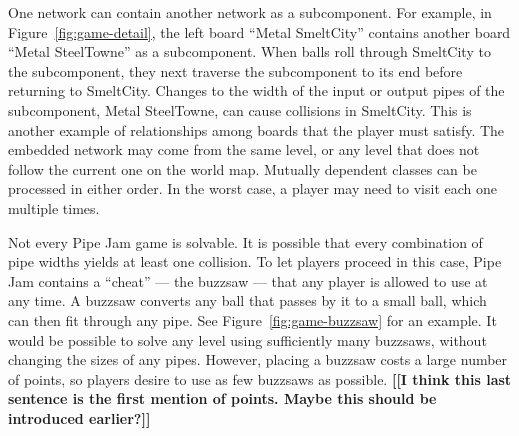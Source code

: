 \documentclass{sig-alternate}
\newcommand{\todo}[1]{{\color{red}\bfseries [[#1]]}}
\let\Description =\description
\def\Nospacing{\itemsep=0pt\topsep=0pt\partopsep=0pt\parskip=0pt\parsep=0pt}
\renewenvironment{description}{\Description\Nospacing}{\endlist}
\begin{document}
\begin{description}
\item[Embedded networks]
  One network can contain another network as a subcomponent.  For example,
  in Figure~\ref{fig:game-detail}, the left board ``Metal SmeltCity''
  contains another board ``Metal SteelTowne'' as a subcomponent.  When
  balls roll through SmeltCity to the subcomponent, they next traverse the
  subcomponent to its end before returning to SmeltCity.  Changes to the
  width of the input or output pipes of the subcomponent, Metal SteelTowne,
  can cause collisions in SmeltCity.  This is another example of
  relationships among boards that the player must satisfy.
  The embedded network may come from the same level, or any level that
  does not follow the current one on the world map.  Mutually dependent
  classes can be processed in either order.  In the worst case, a player
  may need to visit each one multiple times.

\item[Buzzsaws:  Exceptions to the laws of physics]
  Not every Pipe Jam game is solvable.  It is possible that every
  combination of pipe widths yields at least one collision.  To let players
  proceed in this case, Pipe Jam contains a ``cheat'' --- the buzzsaw ---
  that any player is allowed to use at any time.  A buzzsaw converts any
  ball that passes by it to a small ball, which can then fit through any
  pipe.  See Figure~\ref{fig:game-buzzsaw} for an example.
  It would be possible to solve any level using sufficiently many buzzsaws,
  without changing the sizes of any pipes.  However, placing a buzzsaw
  costs a large number of points, so players desire to use as few buzzsaws
  as possible.
  \todo{I think this last sentence is the first mention of
    points. Maybe this should be introduced earlier?}

\end{description}
\end{document}
